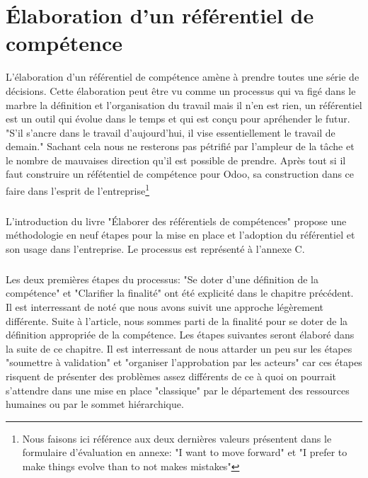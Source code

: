 \chapter{Élaboration d'un référentiel de compétence}
L'élaboration d'un référentiel de compétence amène à prendre toutes une série de décisions. Cette élaboration peut être vu comme un processus qui va figé dans le marbre la définition et l'organisation du travail mais il n'en est rien, un référentiel est un outil qui évolue dans le temps et qui est conçu pour apréhender le futur. "S'il s'ancre dans le travail d'aujourd'hui, il vise essentiellement le travail de demain."\citep[pp.19]{refcompetence} Sachant cela nous ne resterons pas pétrifié par l'ampleur de la tâche et le nombre de mauvaises direction qu'il est possible de prendre. Après tout si il faut construire un réfétentiel de compétence pour Odoo, sa construction dans ce faire dans l'esprit de l'entreprise\footnote{Nous faisons ici référence aux deux dernières valeurs présentent dans le formulaire d'évaluation en annexe: "I want to move forward" et "I prefer to make things evolve than to not makes mistakes"} 

\paragraph{}L'introduction du livre "Élaborer des référentiels de compétences"\citep{refcompetence} propose une méthodologie en neuf étapes pour la mise en place et l'adoption du référentiel et son usage dans l'entreprise. Le processus est représenté à l'annexe C. 

\paragraph{} Les deux premières étapes du processus: "Se doter d'une définition de la compétence" et "Clarifier la finalité" ont été explicité dans le chapitre précédent. Il est interressant de noté que nous avons suivit une approche légèrement différente. Suite à l'article\citep{delobbe}, nous sommes parti de la finalité pour se doter de la définition appropriée de la compétence. Les étapes suivantes seront élaboré dans la suite de ce chapitre. Il est interressant de nous attarder un peu sur les étapes "soumettre à validation" et "organiser l'approbation par les acteurs" car ces étapes risquent de présenter des problèmes assez différents de ce à quoi on pourrait s'attendre dans une mise en place "classique" par le département des ressources humaines ou par le sommet hiérarchique.

